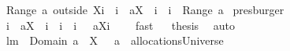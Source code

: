 \begin{isabellebody}
{\isasymUnion}\ {\isacharparenleft}Range\ {\isacharparenleft}{\isacharparenleft}a\ outside\ {\isacharparenleft}X{\isasymunion}{\isacharbraceleft}i{\isacharbraceright}{\isacharparenright}{\isacharparenright}\ {\isasymunion}\ {\isacharparenleft}{\isacharbraceleft}{\isacharparenleft}i{\isacharcomma}\ {\isasymUnion}\ {\isacharparenleft}a{\isacharbackquote}{\isacharbackquote}{\isacharparenleft}X\ {\isasymunion}\ {\isacharbraceleft}i{\isacharbraceright}{\isacharparenright}{\isacharparenright}{\isacharparenright}{\isacharbraceright}\ {\isacharminus}\ {\isacharbraceleft}{\isacharparenleft}i{\isacharcomma}{\isacharbraceleft}{\isacharbraceright}{\isacharparenright}{\isacharbraceright}{\isacharparenright}{\isacharparenright}{\isacharparenright}\ {\isacharequal}\ {\isasymUnion}{\isacharparenleft}Range\ a{\isacharparenright}{\isachardoublequoteclose}\ \isamarkupfalse%
\isanewline
presburger\isanewline
{}\isamarkupfalse%
\ \isamarkupfalse%
\ {\isachardoublequoteopen}{\isacharbraceleft}{\isacharparenleft}i{\isacharcomma}\ {\isasymUnion}\ {\isacharparenleft}a{\isacharbackquote}{\isacharbackquote}{\isacharparenleft}X\ {\isasymunion}\ {\isacharbraceleft}i{\isacharbraceright}{\isacharparenright}{\isacharparenright}{\isacharparenright}{\isacharbraceright}\ {\isacharminus}\ {\isacharbraceleft}{\isacharparenleft}i{\isacharcomma}{\isacharbraceleft}{\isacharbraceright}{\isacharparenright}{\isacharbraceright}\ {\isacharequal}\ {\isacharbraceleft}i{\isacharbraceright}\ {\isasymtimes}\ {\isacharparenleft}{\isacharbraceleft}{\isasymUnion}\ {\isacharparenleft}a{\isacharbackquote}{\isacharbackquote}{\isacharparenleft}X{\isasymunion}{\isacharbraceleft}i{\isacharbraceright}{\isacharparenright}{\isacharparenright}{\isacharbraceright}\ {\isacharminus}\ {\isacharbraceleft}{\isacharbraceleft}{\isacharbraceright}{\isacharbraceright}{\isacharparenright}{\isachardoublequoteclose}\ \isanewline
{}\isamarkupfalse%
\ fast\isanewline
{}\isamarkupfalse%
\ \isamarkupfalse%
\ {\isacharquery}thesis\ \isamarkupfalse%
\ auto\isanewline
{}\isamarkupfalse%
%
\endisatagproof
{\isafoldproof}%
%
\isadelimproof
\isanewline
%
\endisadelimproof
\isanewline
\isanewline
{}\isamarkupfalse%
\ lm{}{}{\isacharcolon}\ \ {\isachardoublequoteopen}Domain\ a\ {\isasyminter}\ X\ {\isasymnoteq}\ {\isacharbraceleft}{\isacharbraceright}{\isachardoublequoteclose}\ {\isachardoublequoteopen}a\ {\isasymin}\ allocationsUniverse{\isachardoublequoteclose}\ \isanewline

\end{isabellebody}
